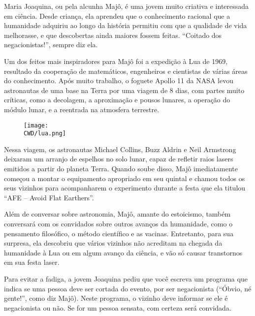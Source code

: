 %

Maria Joaquina, ou pela alcunha Majô, é uma jovem muito criativa e interessada em ciência. Desde criança, ela aprendeu que o conhecimento racional que a humanidade adquiriu ao longo da história permitiu com que a qualidade de vida melhorasse, e que descobertas ainda maiores fossem feitas. “Coitado dos negacionistas!”, sempre diz ela.

Um dos feitos mais inspiradores para Majô foi a expedição à Lua de 1969, resultado da cooperação de matemáticos, engenheiros e cientistas de várias áreas do conhecimento. Após muito trabalho, o foguete Apollo 11 da NASA levou astronautas de uma base na Terra por uma viagem de 8 dias, com partes muito críticas, como a decolagem, a aproximação e pousos lunares, a operação do módulo lunar, e a reentrada na atmosfera terrestre.

\begin{figure}[!htb]
	\centering
	\texttt{[image: \\CWD/lua.png]}
\end{figure}

Nessa viagem, os astronautas Michael Collins, Buzz Aldrin e Neil Armstrong  deixaram um arranjo de espelhos no solo lunar, capaz de refletir raios lasers emitidos a partir do planeta Terra. Quando soube disso, Majô imediatamente começou a montar o equipamento apropriado em seu quintal e chamou todos os seus vizinhos para acompanharem o experimento durante a festa que ela titulou ``AFE – Avoid Flat Earthers''.

Além de conversar sobre astronomia, Majô, amante do estoicismo, também conversará com os convidados sobre outros avanços da humanidade, como o pensamento filosófico, o método científico e as vacinas. Entretanto, para sua surpresa, ela descobriu que vários vizinhos não acreditam na chegada da humanidade à Lua ou em algum avanço da ciência, e vão só causar transtornos em sua festa laser.

Para evitar a fadiga, a jovem Joaquina pediu que você escreva um programa que indica se uma pessoa deve ser cortada do evento, por ser negacionista (``Óbvio, né gente!'', como diz Majô). Neste programa, o vizinho deve informar se ele é negacionista ou não. Se for um pessoa sensata, com certeza será convidada.

